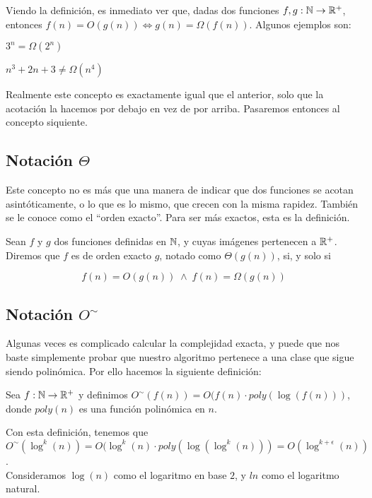 Viendo la definición, es inmediato ver que, dadas dos funciones $f,g:\mathbb{N} \to \mathbb{R}^+$, entonces $f(n) = O(g(n)) \Leftrightarrow g(n) = \Omega(f(n))$. Algunos ejemplos son:

\begin{ejemplo}
	$3^n = \Omega(2^n)$
\end{ejemplo}

\begin{ejemplo}
	$n^3 + 2n + 3 \neq \Omega(n^4)$
\end{ejemplo}

Realmente este concepto es exactamente igual que el anterior, solo que la acotación la hacemos por debajo en vez de por arriba. Pasaremos entonces al concepto siquiente.

\subsection{Notación $\Theta$}

Este concepto no es más que una manera de indicar que dos funciones se acotan asintóticamente, o lo que es lo mismo, que crecen con la misma rapidez. También se le conoce como el ``orden exacto''. Para ser más exactos, esta es la definición.

\begin{definicion}
	Sean $f$ y $g$ dos funciones definidas en $\mathbb{N}$, y cuyas imágenes pertenecen a $\mathbb{R}^+$. Diremos que $f$ es de orden exacto $g$, notado como $\Theta(g(n))$, si, y solo si
	
	$$f(n) = O(g(n))\;\wedge\;f(n) = \Omega(g(n))$$
\end{definicion}

\subsection{Notación $O^\sim$}

Algunas veces es complicado calcular la complejidad exacta, y puede que nos baste simplemente probar que nuestro algoritmo pertenece a una clase que sigue siendo polinómica. Por ello hacemos la siguiente definición:

\begin{definicion}
	Sea $f:\mathbb{N} \to \mathbb{R}^+$ y definimos $O^\sim(f(n)) = O(f(n) \cdot poly(\log(f(n)))$, donde $poly(n)$ es una función polinómica en $n$.
\end{definicion}

Con esta definición, tenemos que $O^\sim(\log^k(n)) = O(\log^k(n) \cdot poly(\log(\log^k(n))) = O(\log^{k+\epsilon}(n))$.\\

Consideramos $\log(n)$ como el logaritmo en base $2$, y $ln$ como el logaritmo natural.

\endinput
